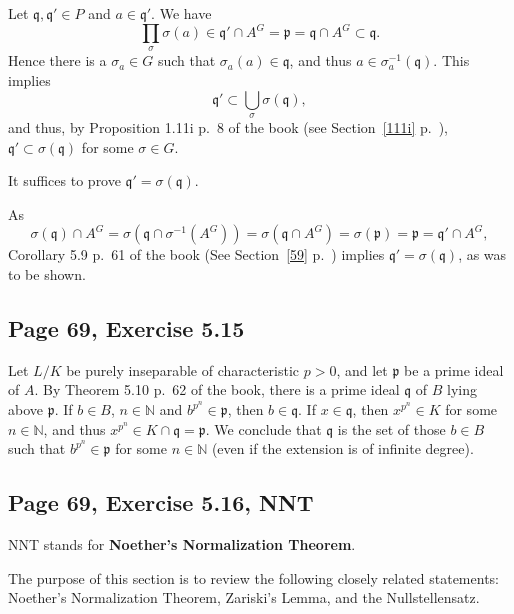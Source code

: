 \documentclass[parskip=half,fontsize=12pt]{scrartcl}%
\newcommand{\mf}{\mathfrak}
\newcommand{\ppp}{\mf p}
\newcommand{\qqq}{\mf q}
\begin{document}
Let $\qqq,\qqq'\in P$ and $a\in\qqq'$. We have  
$$
\prod_\sigma\sigma(a)\in\qqq'\cap A^G=\ppp=\qqq\cap A^G\subset\qqq.
$$ 
Hence there is a $\sigma_a\in G$ such that $\sigma_a(a)\in\qqq$, and thus $a\in\sigma_a^{-1}(\qqq)$. This implies 
$$
\qqq'\subset\bigcup_\sigma\sigma(\qqq),
$$ 
and thus, by Proposition 1.11i p.~8 of the book (see Section~\ref{111i} p.~\pageref{111i}), $\qqq'\subset\sigma(\qqq)$ for some $\sigma\in G$. 

It suffices to prove $\qqq'=\sigma(\qqq)$.

As 
$$
\sigma(\qqq)\cap A^G=\sigma\left(\qqq\cap\sigma^{-1}(A^G)\right)=\sigma\left(\qqq\cap A^G\right)=\sigma(\ppp)=\ppp=\qqq'\cap A^G,
$$ 
Corollary 5.9 p.~61 of the book (See Section~\ref{59} p.~\pageref{59}) implies $\qqq'=\sigma(\qqq)$, as was to be shown.

\subsection{Page 69, Exercise 5.15}%

Let $L/K$ be purely inseparable of characteristic $p>0$, and let $\ppp$ be a prime ideal of $A$. By Theorem 5.10 p.~62 of the book, there is a prime ideal $\qqq$ of $B$ lying above $\ppp$. If $b\in B$, $n\in\mathbb N$ and $b^{p^n}\in\ppp$, then $b\in\qqq$. If $x\in\qqq$, then $x^{p^n}\in K$ for some $n\in\mathbb N$, and thus $x^{p^n}\in K\cap\qqq=\ppp$. We conclude that $\qqq$ is the set of those $b\in B$ such that $b^{p^n}\in\ppp$ for some $n\in\mathbb N$ (even if the extension is of infinite degree).

\subsection{Page 69, Exercise 5.16, NNT}\label{nnt}%

NNT stands for \textbf{Noether's Normalization Theorem}.

The purpose of this section is to review the following closely related statements: Noether's Normalization Theorem, Zariski's Lemma, %
and the Nullstellensatz.

\end{document}
